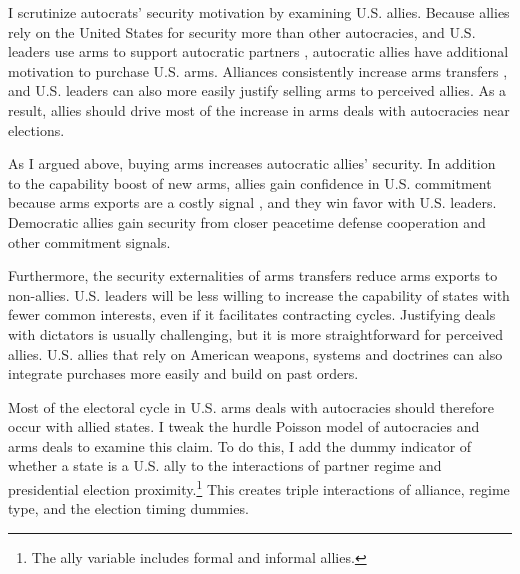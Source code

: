 \documentclass[12pt]{article}
\begin{document}
I scrutinize autocrats' security motivation by examining U.S. allies. 
Because allies rely on the United States for security more than other autocracies, and U.S. leaders use arms to support autocratic partners \citep{Yarhi-Miloetal2016}, autocratic allies have additional motivation to purchase U.S. arms. 
Alliances consistently increase arms transfers \citep{Thurneretal2019}, and U.S. leaders can also more easily justify selling arms to perceived allies. 
As a result, allies should drive most of the increase in arms deals with autocracies near elections. 




As I argued above, buying arms increases autocratic allies' security.
In addition to the capability boost of new arms, allies gain confidence in U.S. commitment because arms exports are a costly signal \citep{McManusYarhi-Milo2017}, and they win favor with U.S. leaders. 
Democratic allies gain security from closer peacetime defense cooperation and other commitment signals.


Furthermore, the security externalities of arms transfers reduce arms exports to non-allies. 
U.S. leaders will be less willing to increase the capability of states with fewer common interests, even if it facilitates contracting cycles.
Justifying deals with dictators is usually challenging, but it is more straightforward for perceived allies. 
U.S. allies that rely on American weapons, systems and doctrines can also integrate purchases more easily and build on past orders. 



Most of the electoral cycle in U.S. arms deals with autocracies should therefore occur with allied states. 
I tweak the hurdle Poisson model of autocracies and arms deals to examine this claim. 
To do this, I add the dummy indicator of whether a state is a U.S. ally to the interactions of partner regime and presidential election proximity.\footnote{The ally variable includes formal and informal allies.}
This creates triple interactions of alliance, regime type, and the election timing dummies. 
\end{document}
